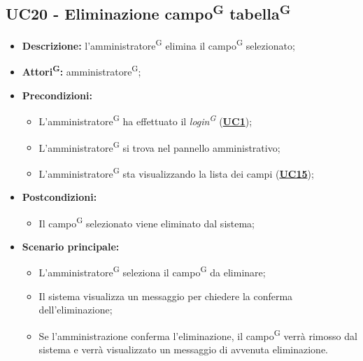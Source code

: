 \subsection{UC20 - Eliminazione campo\textsuperscript{G} tabella\textsuperscript{G}}
\label{sec:UC20}
\begin{itemize}
	\item \textbf{Descrizione:} l’amministratore\textsuperscript{G} elimina il campo\textsuperscript{G} selezionato;
	\item \textbf{Attori\textsuperscript{G}:} amministratore\textsuperscript{G};
	\item \textbf{Precondizioni:} 
	\begin{itemize}
		\item L’amministratore\textsuperscript{G} ha effettuato il \textit{login\textsuperscript{G}} (\hyperref[sec:UC1]{\textbf{UC1}});
		\item L’amministratore\textsuperscript{G} si trova nel pannello amministrativo;
		\item L’amministratore\textsuperscript{G} sta visualizzando la lista dei campi (\hyperref[sec:UC15]{\textbf{UC15}});
	\end{itemize}
	\item \textbf{Postcondizioni:} 
	\begin{itemize}
		\item Il campo\textsuperscript{G} selezionato viene eliminato dal sistema;
	\end{itemize}
	\item \textbf{Scenario principale:} 
	\begin{itemize}
		\item L'amministratore\textsuperscript{G} seleziona il campo\textsuperscript{G} da eliminare;
		\item Il sistema visualizza un messaggio per chiedere la conferma dell'eliminazione;
		\item Se l'amministrazione conferma l'eliminazione, il campo\textsuperscript{G} verrà rimosso dal sistema e verrà visualizzato un messaggio di avvenuta eliminazione.
	\end{itemize}
\end{itemize}

